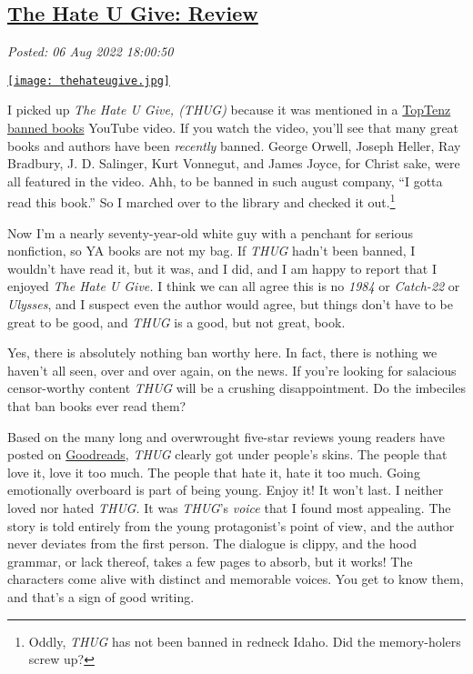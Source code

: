 %

\subsection*{\href{https://analyzethedatanotthedrivel.org/2022/08/06/the-hate-u-give-review/}{The Hate U Give: Review}}


\noindent\emph{Posted: 06 Aug 2022 18:00:50}
\vspace{6pt}


\captionsetup[floatingfigure]{labelformat=empty}
\begin{floatingfigure}[l]{0.21\textwidth}
\centering
\href{https://www.goodreads.com/book/show/58651625-the-hate-u-give}{\texttt{[image: thehateugive.jpg]}}
\label{fig:7452x0}
\end{floatingfigure}  I picked up \emph{The Hate U Give, (THUG)} because it was mentioned in a
\href{https://www.youtube.com/watch?v=5Gcfi-0vPAM}{TopTenz banned books} YouTube 
video. If you watch the video, you'll see that
many great books and authors have been \emph{recently} banned. George
Orwell, Joseph Heller, Ray Bradbury, J. D. Salinger, Kurt Vonnegut, and
James Joyce, for Christ sake, were all featured in the video. Ahh, to be
banned in such august company, ``I gotta read this book.'' So I marched
over to the library and checked it
out.\footnote{Oddly, \emph{THUG} has not been banned in redneck Idaho. Did the
  memory-holers screw up?}

Now I'm a nearly seventy-year-old white guy with a penchant for serious
nonfiction, so YA books are not my bag. If \emph{THUG} hadn't been
banned, I wouldn't have read it, but it was, and I did, and I am happy
to report that I enjoyed \emph{The Hate U Give.} I think we can all
agree this is no \emph{1984} or \emph{Catch-22} or \emph{Ulysses}, and I
suspect even the author would agree, but things don't have to be great
to be good, and \emph{THUG} is a good, but not great, book.

Yes, there is absolutely nothing ban worthy here. In fact, there is
nothing we haven't all seen, over and over again, on the news. If you're
looking for salacious censor-worthy content \emph{THUG} will be a
crushing disappointment. Do the imbeciles that ban books ever read them?

Based on the many long and overwrought five-star reviews young readers
have posted on
\href{https://www.goodreads.com/book/show/58651625-the-hate-u-give}{Goodreads},
\emph{THUG} clearly got under people's skins. The people that love it,
love it too much. The people that hate it, hate it too much. Going
emotionally overboard is part of being young. Enjoy it! It won't last. I
neither loved nor hated \emph{THUG.} It was \emph{THUG}'s \emph{voice}
that I found most appealing. The story is told entirely from the young
protagonist's point of view, and the author never deviates from the
first person. The dialogue is clippy, and the hood grammar, or lack
thereof, takes a few pages to absorb, but it works! The characters come
alive with distinct and memorable voices. You get to know them, and
that's a sign of good writing.

